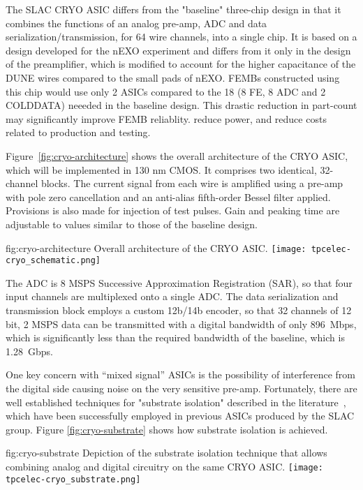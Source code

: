 The SLAC CRYO ASIC differs from the "baseline" three-chip design in that it combines the functions of an analog pre-amp, ADC and data serialization/transmission, for 64 wire channels, into a single chip.
It is based on a design developed for the nEXO experiment and differs from it only in the design of the preamplifier, which is modified to account for the higher capacitance of the DUNE wires compared to the small pads of nEXO.
FEMBs constructed using this chip would use only 2 ASICs compared to the 18 (8 FE, 8 ADC and 2 COLDDATA) neeeded in the baseline design.
This drastic reduction in part-count may significantly improve FEMB reliablity. reduce power, and reduce costs related to production and testing. 

Figure~\ref{fig:cryo-architecture} shows the overall architecture of the CRYO ASIC, which will be implemented in 130 nm CMOS.
It comprises two identical, 32-channel blocks. 
The current signal from each wire is amplified using a pre-amp with pole zero cancellation and an anti-alias fifth-order Bessel filter applied. 
Provisions is also made for injection of test pulses. 
Gain and peaking time are adjustable to values similar to those of the baseline design.

\begin{dunefigure}
{fig:cryo-architecture}
{Overall architecture of the CRYO ASIC.}
\texttt{[image: tpcelec-cryo\_schematic.png]}
\end{dunefigure}

The ADC is 8 MSPS Successive Approximation Registration (SAR), so that four input channels are multiplexed onto a single ADC. The data serialization and transmission block employs a custom 12b/14b encoder, so that 32 channels of 12 bit, 2 MSPS data can be transmitted with a digital bandwidth of only 896~Mbps, which is significantly less than the required bandwidth of the baseline, which is 1.28~Gbps.

One key concern with ``mixed signal'' ASICs is the possibility of interference from the digital side causing noise on the very sensitive pre-amp. 
Fortunately, there are well established techniques for "substrate isolation" described in the literature~\cite{yeh}, which have been successfully employed in previous ASICs produced by the SLAC group. Figure \ref{fig:cryo-substrate} shows how substrate isolation is achieved. 

\begin{dunefigure}
{fig:cryo-substrate}
{Depiction of the substrate isolation technique that allows combining analog and digital circuitry on the same CRYO ASIC.}
\texttt{[image: tpcelec-cryo\_substrate.png]}
\end{dunefigure}

